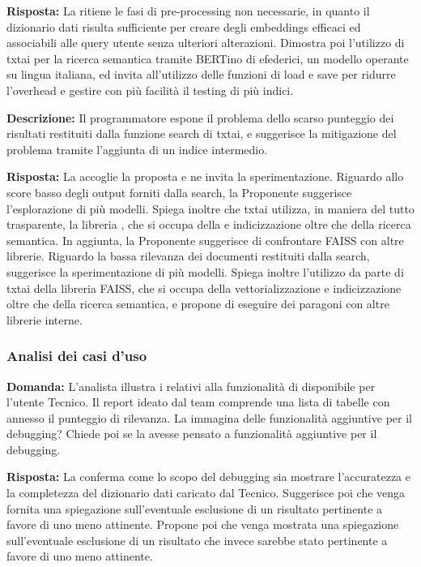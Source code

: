 \textbf{Risposta: }La  ritiene le fasi di pre-processing non necessarie, in quanto il dizionario dati risulta sufficiente per creare degli embeddings efficaci ed associabili alle query utente senza ulteriori alterazioni. 
Dimostra poi l'utilizzo di txtai per la ricerca semantica tramite BERTino di efederici, un modello operante su lingua italiana, ed invita all'utilizzo delle funzioni di load e save per ridurre l'overhead e gestire con più facilità il testing di più indici.

\textbf{Descrizione:} Il programmatore espone il problema dello scarso punteggio dei risultati restituiti dalla funzione search di txtai, e suggerisce la mitigazione del problema tramite l'aggiunta di un indice intermedio. 

\textbf{Risposta:} La  accoglie la proposta e ne invita la sperimentazione. 
Riguardo allo score basso degli output forniti dalla search, la Proponente suggerisce l'esplorazione di più modelli. 
Spiega inoltre che txtai utilizza, in maniera del tutto trasparente, la libreria , che si occupa della  e indicizzazione oltre che della ricerca semantica. In aggiunta, la Proponente suggerisce di confrontare FAISS con altre librerie.
Riguardo la bassa rilevanza dei documenti restituiti dalla search, suggerisce la sperimentazione di più modelli. 
Spiega inoltre l'utilizzo da parte di txtai della libreria FAISS, che si occupa della vettorializzazione e indicizzazione oltre che della ricerca semantica, e propone di eseguire dei paragoni con altre librerie interne.

\subsubsection{Analisi dei casi d'uso}

\textbf{Domanda:} L'analista illustra i  relativi alla funzionalità di  disponibile per l'utente Tecnico. Il report ideato dal team comprende una lista di tabelle con annesso il punteggio di rilevanza. 
La  immagina delle funzionalità aggiuntive per il debugging?
Chiede poi se la  avesse pensato a funzionalità aggiuntive per il debugging.

\textbf{Risposta:} La  conferma come lo scopo del debugging sia mostrare l'accuratezza e la completezza del dizionario dati caricato dal Tecnico. 
Suggerisce poi che venga fornita una spiegazione sull'eventuale esclusione di un risultato pertinente a favore di uno meno attinente.
Propone poi che venga mostrata una spiegazione sull'eventuale esclusione di un risultato che invece sarebbe stato pertinente a favore di uno meno attinente.

